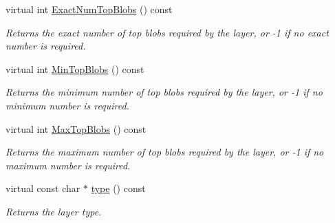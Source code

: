 \begin{DoxyCompactItemize}
virtual int \mbox{\hyperlink{classcaffe_1_1_infogain_loss_layer_aaf55e75f2296586b1fee0175e2d72fbb}{Exact\+Num\+Top\+Blobs}} () const
\begin{DoxyCompactList}\small\item\em Returns the exact number of top blobs required by the layer, or -\/1 if no exact number is required. \end{DoxyCompactList}\item 
virtual int \mbox{\hyperlink{classcaffe_1_1_infogain_loss_layer_a15c4916e5de27151eb745491d8d14d41}{Min\+Top\+Blobs}} () const
\begin{DoxyCompactList}\small\item\em Returns the minimum number of top blobs required by the layer, or -\/1 if no minimum number is required. \end{DoxyCompactList}\item 
virtual int \mbox{\hyperlink{classcaffe_1_1_infogain_loss_layer_a93019601c6256354fd4758da91d9311f}{Max\+Top\+Blobs}} () const
\begin{DoxyCompactList}\small\item\em Returns the maximum number of top blobs required by the layer, or -\/1 if no maximum number is required. \end{DoxyCompactList}\item 
\mbox{\label{classcaffe_1_1_infogain_loss_layer_aada26ffd60207582fe2af602004e271b}} 
virtual const char $\ast$ \mbox{\hyperlink{classcaffe_1_1_infogain_loss_layer_aada26ffd60207582fe2af602004e271b}{type}} () const
\begin{DoxyCompactList}\small\item\em Returns the layer type. \end{DoxyCompactList}\end{DoxyCompactItemize}
